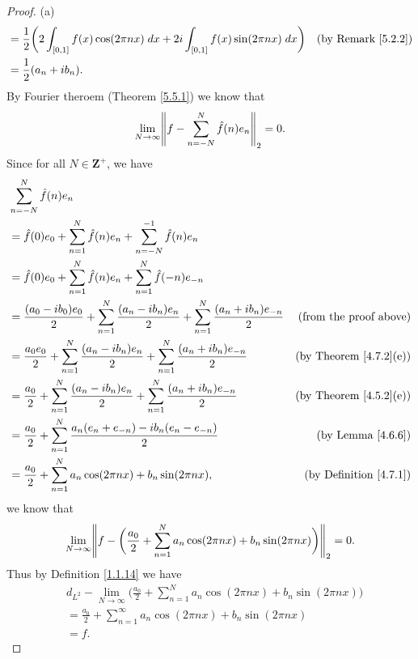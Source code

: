 \begin{proof}{(a)}
\begin{align*}
         & = \frac{1}{2} \bigg(2 \int_{[0, 1]} f(x) \cos(2 \pi n x) \; dx + 2i \int_{[0, 1]} f(x) \sin(2 \pi n x) \; dx\bigg) & \text{(by Remark \ref{5.2.2})}     \\
         & = \frac{1}{2} (a_n + i b_n).
    \end{align*}
    By Fourier theroem (Theorem \ref{5.5.1}) we know that
    \[
        \lim_{N \to \infty} \norm*{f - \sum_{n = -N}^N \hat{f}(n) e_n}_2 = 0.
    \]
    Since for all \(N \in \mathbf{Z}^+\), we have
    \begin{align*}
         & \sum_{n = -N}^N \hat{f}(n) e_n                                                                                                                                  \\
         & = \hat{f}(0) e_0 + \sum_{n = 1}^N \hat{f}(n) e_n + \sum_{n = -N}^{-1} \hat{f}(n) e_n                                                                            \\
         & = \hat{f}(0) e_0 + \sum_{n = 1}^N \hat{f}(n) e_n + \sum_{n = 1}^N \hat{f}(-n) e_{-n}                                                                            \\
         & = \frac{(a_0 - i b_0) e_0}{2} + \sum_{n = 1}^N \frac{(a_n - i b_n) e_n}{2} + \sum_{n = 1}^N \frac{(a_n + i b_n) e_{-n}}{2} & \text{(from the proof above)}      \\
         & = \frac{a_0 e_0}{2} + \sum_{n = 1}^N \frac{(a_n - i b_n) e_n}{2} + \sum_{n = 1}^N \frac{(a_n + i b_n) e_{-n}}{2}           & \text{(by Theorem \ref{4.7.2}(e))} \\
         & = \frac{a_0}{2} + \sum_{n = 1}^N \frac{(a_n - i b_n) e_n}{2} + \sum_{n = 1}^N \frac{(a_n + i b_n) e_{-n}}{2}               & \text{(by Theorem \ref{4.5.2}(e))} \\
         & = \frac{a_0}{2} + \sum_{n = 1}^N \frac{a_n (e_n + e_{-n}) - i b_n (e_n - e_{-n})}{2}                                       & \text{(by Lemma \ref{4.6.6})}      \\
         & = \frac{a_0}{2} + \sum_{n = 1}^N a_n \cos(2 \pi n x) + b_n \sin(2 \pi n x),                                                & \text{(by Definition \ref{4.7.1})}
    \end{align*}
    we know that
    \[
        \lim_{N \to \infty} \norm*{f - \bigg(\frac{a_0}{2} + \sum_{n = 1}^N a_n \cos(2 \pi n x) + b_n \sin(2 \pi n x)\bigg)}_2 = 0.
    \]
    Thus by Definition \ref{1.1.14} we have
    \begin{align*}
         & d_{L^2} - \lim_{N \to \infty} \bigg(\frac{a_0}{2} + \sum_{n = 1}^N a_n \cos(2 \pi n x) + b_n \sin(2 \pi n x)\bigg) \\
         & = \frac{a_0}{2} + \sum_{n = 1}^\infty a_n \cos(2 \pi n x) + b_n \sin(2 \pi n x)                                    \\
         & = f.
    \end{align*}
\end{proof}

